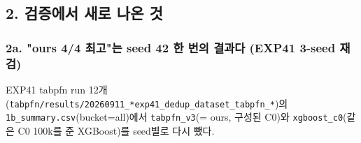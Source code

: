 \subsection{2. 검증에서 새로 나온 것}
\subsubsection{2a. "ours 4/\allowbreak{}4 최고"는 seed 42 한 번의 결과다 (EXP41 3-seed 재검)}
EXP41 tabpfn run 12개(\texttt{tabpfn/\allowbreak{}\allowbreak{}r\allowbreak{}esults/\allowbreak{}\allowbreak{}2\allowbreak{}0260911\_\allowbreak{}\allowbreak{}*exp41\_\allowbreak{}\allowbreak{}d\allowbreak{}edup\_\allowbreak{}\allowbreak{}dat\allowbreak{}aset\_\allowbreak{}\allowbreak{}tab\allowbreak{}pfn\_\allowbreak{}\allowbreak{}*})의 \texttt{1b\_\allowbreak{}\allowbreak{}summa\allowbreak{}ry.\allowbreak{}csv}(bucket=\allowbreak{}all)에서 \texttt{tabpfn\_\allowbreak{}\allowbreak{}v\allowbreak{}3}(=\allowbreak{} ours, 구성된 C0)와 \texttt{xgboost\_\allowbreak{}\allowbreak{}c0}(같은 C0 100k를 준 XGBoost)를 seed별로 다시 뺐다.

